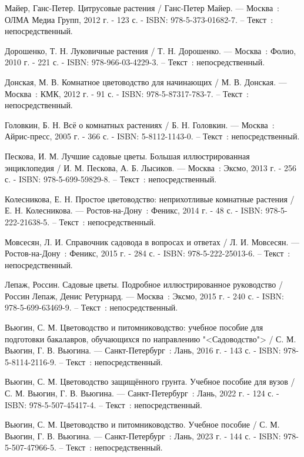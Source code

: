 \begin{thebibliography}{9}
	 Майер, Ганс-Петер. Цитрусовые растения / Ганс-Петер Майер. — Москва~: ОЛМА Медиа Групп, 2012 г. - 123 с. - ISBN: 978-5-373-01682-7. – Текст~: непосредственный.
	
	 Дорошенко, Т. Н. Луковичные растения / Т. Н. Дорошенко. — Москва~: Фолио, 2010 г. - 221 с. - ISBN: 978-966-03-4229-3. – Текст~: непосредственный.
	
	 Донская, М. В. Комнатное цветоводство для начинающих / М. В. Донская. — Москва~: КМК, 2012 г. - 91 с. - ISBN: 978-5-87317-783-7. – Текст~: непосредственный.
	
	 Головкин, Б. Н. Всё о комнатных растениях / Б. Н. Головкин. — Москва~: Айрис-пресс, 2005 г. - 366 с. - ISBN: 5-8112-1143-0. – Текст~: непосредственный.
	
	 Пескова, И. М. Лучшие садовые цветы. Большая иллюстрированная энциклопедия / И. М. Пескова, А. Б. Лысиков. — Москва~: Эксмо, 2013 г. - 256 с. - ISBN: 978-5-699-59829-8. – Текст~: непосредственный.
	
	 Колесникова, Е. Н. Простое цветоводство: неприхотливые комнатные растения / Е. Н. Колесникова. — Ростов-на-Дону~: Феникс, 2014 г. - 48 с. - ISBN: 978-5-222-21638-5. – Текст~: непосредственный.
	
	 Мовсесян, Л. И. Справочник садовода в вопросах и ответах / Л. И. Мовсесян. — Ростов-на-Дону~: Феникс, 2015 г. - 284 с. - ISBN: 978-5-222-25013-6. – Текст~: непосредственный.
	
	 Лепаж, Россин. Садовые цветы. Подробное иллюстрированное руководство / Россин Лепаж, Денис Ретурнард. — Москва~: Эксмо, 2015 г. - 240 с. - ISBN: 978-5-699-63469-9. – Текст~: непосредственный.
	
	 Вьюгин, С. М. Цветоводство и питомниководство: учебное пособие для подготовки бакалавров, обучающихся по направлению "<Садоводство"> / С. М. Вьюгин, Г. В. Вьюгина. — Санкт-Петербург~: Лань, 2016 г. - 143 с. - ISBN: 978-5-8114-2116-9. – Текст~: непосредственный.
	
	 Вьюгин, С. М. Цветоводство защищённого грунта. Учебное пособие для вузов / С. М. Вьюгин, Г. В. Вьюгина. — Санкт-Петербург~: Лань, 2022 г. - 124 с. - ISBN: 978-5-507-45417-4. – Текст~: непосредственный.
	
	 Вьюгин, С. М. Цветоводство и питомниководство. Учебное пособие / С. М. Вьюгин, Г. В. Вьюгина. — Санкт-Петербург~: Лань, 2023 г. - 144 с. - ISBN: 978-5-507-47966-5. – Текст~: непосредственный.
	

\end{thebibliography}

